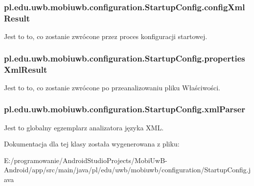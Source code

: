 \subsubsection[{config\+Xml\+Result}]{ pl.\+edu.\+uwb.\+mobiuwb.\+configuration.\+Startup\+Config.\+config\+Xml\+Result\hspace{0.3cm}{\ttfamily [static]}}\label{classpl_1_1edu_1_1uwb_1_1mobiuwb_1_1configuration_1_1_startup_config_a553d895b6e31e82dcd05ab6a4b6a0b1c}
Jest to to, co zostanie zwrócone przez proces konfiguracji startowej. \hypertarget{classpl_1_1edu_1_1uwb_1_1mobiuwb_1_1configuration_1_1_startup_config_a320814a7c5ad1d065922dec45ea1e2ea}{}
\subsubsection[{properties\+Xml\+Result}]{ pl.\+edu.\+uwb.\+mobiuwb.\+configuration.\+Startup\+Config.\+properties\+Xml\+Result\hspace{0.3cm}{\ttfamily [static]}}\label{classpl_1_1edu_1_1uwb_1_1mobiuwb_1_1configuration_1_1_startup_config_a320814a7c5ad1d065922dec45ea1e2ea}
Jest to to, co zostanie zwrócone po przeanalizowaniu pliku Właściwości. \hypertarget{classpl_1_1edu_1_1uwb_1_1mobiuwb_1_1configuration_1_1_startup_config_a015db43e9326c413b6caf4ed155fdf28}{}
\subsubsection[{xml\+Parser}]{ pl.\+edu.\+uwb.\+mobiuwb.\+configuration.\+Startup\+Config.\+xml\+Parser\hspace{0.3cm}{\ttfamily [static]}}\label{classpl_1_1edu_1_1uwb_1_1mobiuwb_1_1configuration_1_1_startup_config_a015db43e9326c413b6caf4ed155fdf28}
Jest to globalny egzemplarz analizatora języka X\+M\+L. 

Dokumentacja dla tej klasy została wygenerowana z pliku\+:\begin{DoxyCompactItemize}
\item 
E\+:/programowanie/\+Android\+Studio\+Projects/\+Mobi\+Uw\+B-\/\+Android/app/src/main/java/pl/edu/uwb/mobiuwb/configuration/Startup\+Config.\+java\end{DoxyCompactItemize}
